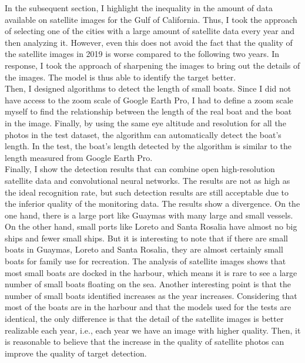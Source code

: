 In the subsequent section, I highlight the inequality in the amount of data available on satellite images for the Gulf of California. Thus, I took the approach of selecting one of the cities with a large amount of satellite data every year and then analyzing it. However, even this does not avoid the fact that the quality of the satellite images in 2019 is worse compared to the following two years. In response, I took the approach of sharpening the images to bring out the details of the images. The model is thus able to identify the target better.\\

Then, I designed algorithms to detect the length of small boats. Since I did not have access to the zoom scale of Google Earth Pro, I had to define a zoom scale myself to find the relationship between the length of the real boat and the boat in the image. Finally, by using the same eye altitude and resolution for all the photos in the test dataset, the algorithm can automatically detect the boat's length. In the test, the boat's length detected by the algorithm is similar to the length measured from Google Earth Pro.\\

Finally, I show the detection results that can combine open high-resolution satellite data and convolutional neural networks. The results are not as high as the ideal recognition rate, but such detection results are still acceptable due to the inferior quality of the monitoring data. The results show a divergence. On the one hand, there is a large port like Guaymas with many large and small vessels. On the other hand, small ports like Loreto and Santa Rosalia have almost no big ships and fewer small ships. But it is interesting to note that if there are small boats in Guaymas, Loreto and Santa Rosalia, they are almost certainly small boats for family use for recreation. The analysis of satellite images shows that most small boats are docked in the harbour, which means it is rare to see a large number of small boats floating on the sea. Another interesting point is that the number of small boats identified increases as the year increases. Considering that most of the boats are in the harbour and that the models used for the tests are identical, the only difference is that the detail of the satellite images is better realizable each year, i.e., each year we have an image with higher quality. Then, it is reasonable to believe that the increase in the quality of satellite photos can improve the quality of target detection.



